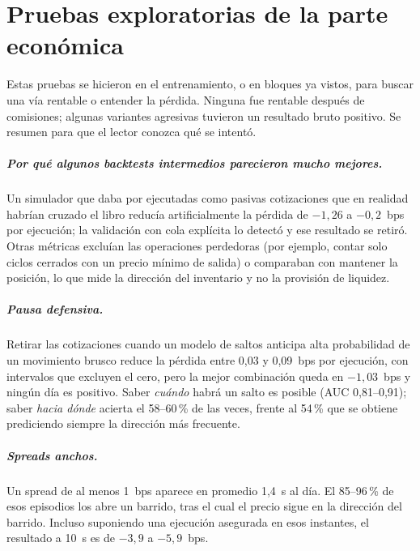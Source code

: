\chapter{Pruebas exploratorias de la parte económica}
\label{app:p2-exploratorio}

Estas pruebas se hicieron en el entrenamiento, o en bloques ya vistos, para buscar una vía rentable o entender la pérdida. Ninguna fue rentable después de comisiones; algunas variantes agresivas tuvieron un resultado bruto positivo. Se resumen para que el lector conozca qué se intentó.

\paragraph{Por qué algunos \textit{backtests} intermedios parecieron mucho mejores.} Un simulador que daba por ejecutadas como pasivas cotizaciones que en realidad habrían cruzado el libro reducía artificialmente la pérdida de $-1{,}26$ a $-0{,}2$~bps por ejecución; la validación con cola explícita lo detectó y ese resultado se retiró. Otras métricas excluían las operaciones perdedoras (por ejemplo, contar solo ciclos cerrados con un precio mínimo de salida) o comparaban con mantener la posición, lo que mide la dirección del inventario y no la provisión de liquidez.

\paragraph{Pausa defensiva.} Retirar las cotizaciones cuando un modelo de saltos anticipa alta probabilidad de un movimiento brusco reduce la pérdida entre 0,03 y 0,09~bps por ejecución, con intervalos que excluyen el cero, pero la mejor combinación queda en $-1{,}03$~bps y ningún día es positivo. Saber \emph{cuándo} habrá un salto es posible (AUC 0,81--0,91); saber \emph{hacia dónde} acierta el 58--60\,\% de las veces, frente al 54\,\% que se obtiene prediciendo siempre la dirección más frecuente.

\paragraph{Spreads anchos.} Un spread de al menos 1~bps aparece en promedio 1,4~s al día. El 85--96\,\% de esos episodios los abre un barrido, tras el cual el precio sigue en la dirección del barrido. Incluso suponiendo una ejecución asegurada en esos instantes, el resultado a 10~s es de $-3{,}9$ a $-5{,}9$~bps.

